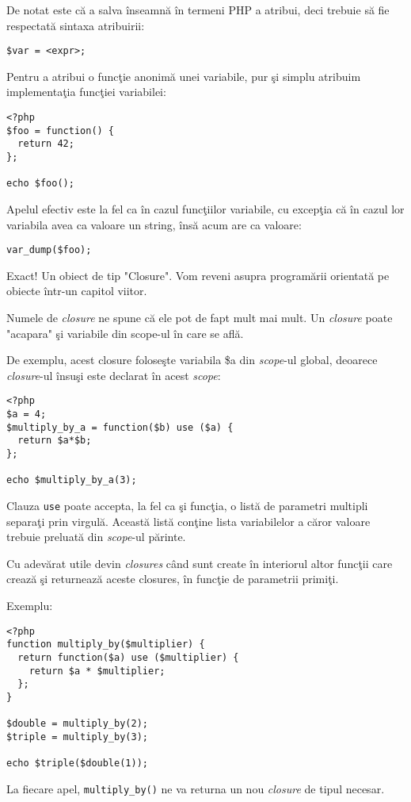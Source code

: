De notat este că a salva înseamnă în termeni PHP a atribui, deci
trebuie să fie respectată sintaxa atribuirii:
\begin{verbatim}
$var = <expr>;
\end{verbatim}
Pentru a atribui o funcţie anonimă unei variabile, pur şi simplu
atribuim implementaţia funcţiei variabilei:
\begin{lstlisting}
<?php
$foo = function() {
  return 42;
};

echo $foo();
\end{lstlisting}
Apelul efectiv este la fel ca în cazul funcţiilor variabile,
cu excepţia că în cazul lor variabila avea ca valoare un string, însă
acum are ca valoare:
\begin{lstlisting}
var_dump($foo);
\end{lstlisting}
Exact! Un obiect de tip "Closure". Vom reveni asupra
programării orientată pe obiecte
într-un capitol viitor.

Numele de \textit{closure} ne spune că ele pot de fapt mult mai mult.
Un \textit{closure} poate "acapara" şi variabile din scope-ul în care se află.

De exemplu, acest closure foloseşte variabila \$a din \textit{scope}-ul global,
deoarece \textit{closure}-ul însuşi este declarat în acest \textit{scope}:
\begin{lstlisting}
<?php
$a = 4;
$multiply_by_a = function($b) use ($a) {
  return $a*$b;
};

echo $multiply_by_a(3);
\end{lstlisting}
Clauza \texttt{use} poate accepta,
la fel ca şi funcţia, o listă de parametri multipli
separaţi prin virgulă. Această listă conţine lista variabilelor
a căror valoare trebuie preluată din \textit{scope}-ul părinte.

Cu adevărat utile devin \textit{closures} când sunt 
create în interiorul altor funcţii care crează şi
returnează aceste closures, în funcţie de parametrii primiţi.

Exemplu:
\begin{lstlisting}
<?php
function multiply_by($multiplier) {
  return function($a) use ($multiplier) {
	return $a * $multiplier;
  };
}

$double = multiply_by(2);
$triple = multiply_by(3);

echo $triple($double(1));
\end{lstlisting}
La fiecare apel, \texttt{multiply\_by()} ne va returna
un nou \textit{closure} de tipul necesar.

